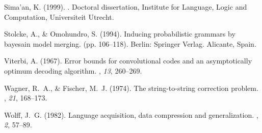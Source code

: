 \documentclass[letterpaper,mlapa]{article}
\begin{document}
\begin{thebibliography}{}
Sima'an, K. (1999).
.
\newblock Doctoral dissertation, Institute for Language, Logic and Computation,
  Universiteit Utrecht.

Stolcke, A., \& Omohundro, S. (1994).
\newblock Inducing probabilistic grammars by bayesain model merging.
 (pp.\/ 106--118).
\newblock Berlin: Springer Verlag.
\newblock Alicante, Spain.

Viterbi, A. (1967).
\newblock Error bounds for convolutional codes and an asymptotically optimum
  decoding algorithm.
, {\em 13}, 260--269.

Wagner, R.~A., \& Fischer, M.~J. (1974).
\newblock The string-to-string correction problem.
, {\em 21},
  168--173.

Wolff, J.~G. (1982).
\newblock Language acquisition, data compression and generalization.
, {\em 2}, 57--89.

\end{thebibliography}
\end{document}
